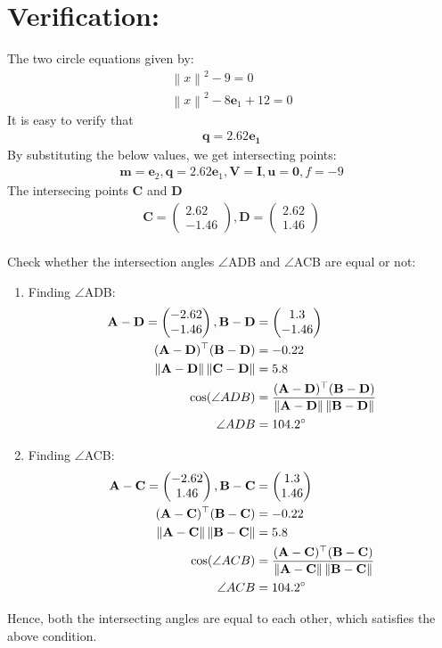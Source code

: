 \documentclass[12pt]{article}
\providecommand{\norm}[1]{\left\lVert#1\right\rVert}
\newcommand{\myvec}[1]{\ensuremath{\begin{pmatrix}#1\end{pmatrix}}}
\let\vec\mathbf
\begin{document}
\section*{Verification:}
 The two circle equations given by:
\begin{align}
	\norm{x}^2-9=0\\
	\norm{x}^2-8\vec{e}_1+12=0
\end{align}
 It is easy to verify that
\begin{align}
	\vec{q}=2.62\vec{e_1}
\end{align}
By substituting the below values, we get intersecting points: 
 \begin{align}
	 \vec{m}=\vec{e}_2,\vec{q}=2.62\vec{e}_1,\vec{V}=\vec{I},\vec{u}=\vec{0},f=-9
\end{align}
The intersecing points $\vec{C}$ and $\vec{D}$
\begin{align}
    \vec{C}=\myvec{
2.62\\
-1.46
    },
    \vec{D}=\myvec{
2.62\\
1.46
    }
\end{align}
\\
Check whether the intersection angles $\angle$ADB and $\angle$ACB are equal or not:
\begin{enumerate}
\item Finding $\angle$ADB:
	\begin{align}
		 \vec{A-D} = \myvec{-2.62\\-1.46},
		\vec{B-D}& = \myvec{1.3\\-1.46}\\
	 \vec{(A-D)^\top(B-D)}&= -0.22\\
	 \norm{\vec{A-D}}\norm{\vec{C-D}}& = 5.8\\
		\cos(\angle ADB)& = \frac{\vec{(A-D)^\top(B-D)}}{\norm{\vec{A-D}}\norm{\vec{B-D}}}\\
		\angle ADB&=104.2\degree
\end{align}
\item Finding $\angle$ACB:
\begin{align}
	\vec{A-C} = \myvec{-2.62\\1.46},
	 \vec{B-C}& = \myvec{1.3\\1.46}\\
	 \vec{(A-C)^\top(B-C)}&= -0.22\\
	 \norm{\vec{A-C}}\norm{\vec{B-C}}& = 5.8\\
	 \cos(\angle ACB) &= \frac{\vec{(A-C)^\top(B-C)}}{\norm{\vec{A-C}}\norm{\vec{B-C}}}\\
	 \angle ACB&=104.2\degree
\end{align}
\end{enumerate}
Hence, both the intersecting angles are equal to each other, which satisfies the above condition.
\end{document}
